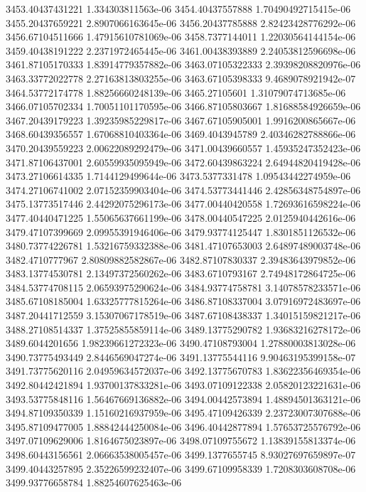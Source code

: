 {3453.40437431221 1.334303811563e-06
3454.40437557888 1.70490492715415e-06
3455.20437659221 2.8907066163645e-06
3456.20437785888 2.82423428776292e-06
3456.67104511666 1.47915610781069e-06
3458.7377144011 1.22030564144154e-06
3459.40438191222 2.2371972465445e-06
3461.00438393889 2.24053812596698e-06
3461.87105170333 1.83914779357882e-06
3463.07105322333 2.39398208820976e-06
3463.33772022778 2.27163813803255e-06
3463.67105398333 9.4689078921942e-07
3464.53772174778 1.88256660248139e-06
3465.27105601 1.31079074713685e-06
3466.07105702334 1.70051101170595e-06
3466.87105803667 1.81688584926659e-06
3467.20439179223 1.39235985229817e-06
3467.67105905001 1.9916200865667e-06
3468.60439356557 1.67068810403364e-06
3469.4043945789 2.40346282788866e-06
3470.20439559223 2.00622089292479e-06
3471.00439660557 1.45935247352423e-06
3471.87106437001 2.60559935095949e-06
3472.60439863224 2.64944820419428e-06
3473.27106614335 1.7144129499644e-06
3473.5377331478 1.09543442274959e-06
3474.27106741002 2.07152359903404e-06
3474.53773441446 2.42856348754897e-06
3475.13773517446 2.44292075296173e-06
3477.00440420558 1.72693616598224e-06
3477.40440471225 1.55065637661199e-06
3478.00440547225 2.0125940442616e-06
3479.47107399669 2.09955391946406e-06
3479.93774125447 1.8301851126532e-06
3480.73774226781 1.53216759332388e-06
3481.47107653003 2.64897489003748e-06
3482.4710777967 2.80809882582867e-06
3482.87107830337 2.39483643979852e-06
3483.13774530781 2.13497372560262e-06
3483.6710793167 2.74948172864725e-06
3484.53774708115 2.06593975290624e-06
3484.93774758781 3.14078578233571e-06
3485.67108185004 1.63325777815264e-06
3486.87108337004 3.07916972483697e-06
3487.20441712559 3.15307067178519e-06
3487.67108438337 1.34015159821217e-06
3488.27108514337 1.37525855859114e-06
3489.13775290782 1.93683216278172e-06
3489.6044201656 1.98239661272323e-06
3490.47108793004 1.27880003813028e-06
3490.73775493449 2.8446569047274e-06
3491.13775544116 9.90463195399158e-07
3491.73775620116 2.04959634572037e-06
3492.13775670783 1.83622356469354e-06
3492.80442421894 1.93700137833281e-06
3493.07109122338 2.05820123221631e-06
3493.53775848116 1.56467669136882e-06
3494.00442573894 1.48894501363121e-06
3494.87109350339 1.15160216937959e-06
3495.47109426339 2.23723007307688e-06
3495.87109477005 1.88842444250084e-06
3496.40442877894 1.57653725576792e-06
3497.07109629006 1.8164675023897e-06
3498.07109755672 1.13839155813374e-06
3498.60443156561 2.06663538005457e-06
3499.1377655745 8.93027697659897e-07
3499.40443257895 2.35226599232407e-06
3499.67109958339 1.7208303608708e-06
3499.93776658784 1.88254607625463e-06
}
